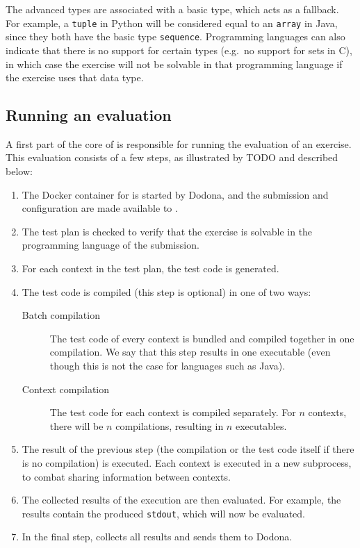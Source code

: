 \documentclass[5p,number]{elsarticle}
\begin{document}
    The advanced types are associated with a basic type, which acts as a fallback.
    For example, a \texttt{tuple} in Python will be considered equal to an \texttt{array} in Java, since they both have the basic type \texttt{sequence}.
    Programming languages can also indicate that there is no support for certain types (e.g.\ no support for sets in C), in which case the exercise will not be solvable in that programming language if the exercise uses that data type.


    \subsection{Running an evaluation}\label{subsec:running-an-evaluation}

    A first part of the core of \tested{} is responsible for running the evaluation of an exercise.
    This evaluation consists of a few steps, as illustrated by TODO and described below:

    \begin{enumerate}
        \item The Docker container for \tested{} is started by Dodona, and the submission and configuration are made available to \tested{}.
        \item The test plan is checked to verify that the exercise is solvable in the programming language of the submission.
        \item For each context in the test plan, the test code is generated.
        \item The test code is compiled (this step is optional) in one of two ways:
        \begin{description}
            \item[Batch compilation] The test code of every context is bundled and compiled together in one compilation.
            We say that this step results in one executable (even though this is not the case for languages such as Java).
            \item[Context compilation] The test code for each context is compiled separately.
            For $n$ contexts, there will be $n$ compilations, resulting in $n$ executables.
        \end{description}
        \item The result of the previous step (the compilation or the test code itself if there is no compilation) is executed.
        Each context is executed in a new subprocess, to combat sharing information between contexts.
        \item The collected results of the execution are then evaluated.
        For example, the results contain the produced \texttt{stdout}, which will now be evaluated.
        \item In the final step, \tested{} collects all results and sends them to Dodona.
    \end{enumerate}
    
\end{document}
